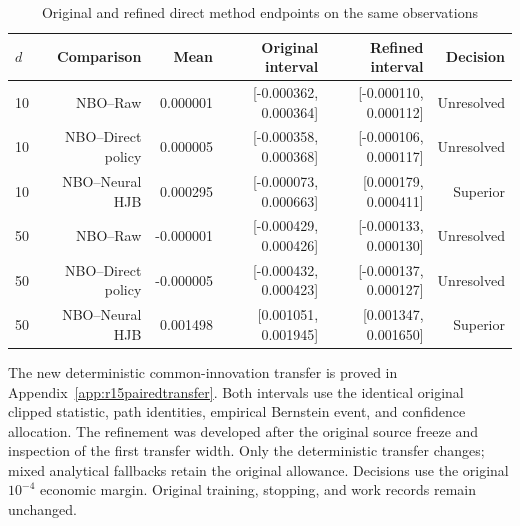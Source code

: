 \begin{table}[!htbp]
\centering\small
\caption{Original and refined direct method endpoints on the same observations}
\label{tab:r15-paired-refined-main}
\begin{tabular}{lrrrrr}
\toprule
$d$ & Comparison & Mean & Original interval & Refined interval & Decision \\
\midrule
10 & NBO--Raw & 0.000001 & [-0.000362, 0.000364] & [-0.000110, 0.000112] & Unresolved \\
10 & NBO--Direct policy & 0.000005 & [-0.000358, 0.000368] & [-0.000106, 0.000117] & Unresolved \\
10 & NBO--Neural HJB & 0.000295 & [-0.000073, 0.000663] & [0.000179, 0.000411] & Superior \\
50 & NBO--Raw & -0.000001 & [-0.000429, 0.000426] & [-0.000133, 0.000130] & Unresolved \\
50 & NBO--Direct policy & -0.000005 & [-0.000432, 0.000423] & [-0.000137, 0.000127] & Unresolved \\
50 & NBO--Neural HJB & 0.001498 & [0.001051, 0.001945] & [0.001347, 0.001650] & Superior \\
\bottomrule
\end{tabular}
\par\medskip\noindent\footnotesize The new deterministic common-innovation transfer is proved in Appendix~\ref{app:r15pairedtransfer}. Both intervals use the identical original clipped statistic, path identities, empirical Bernstein event, and confidence allocation. The refinement was developed after the original source freeze and inspection of the first transfer width. Only the deterministic transfer changes; mixed analytical fallbacks retain the original allowance. Decisions use the original $10^{-4}$ economic margin. Original training, stopping, and work records remain unchanged.
\end{table}
